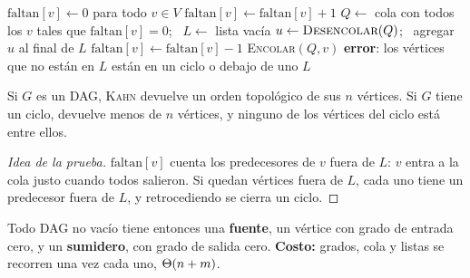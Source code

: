 \documentclass[11pt,letterpaper]{article}
\begin{document}
\begin{algorithm}[H]
\caption{\textsc{Kahn}$(G)$, orden topológico por grados de entrada}
\label{alg:kahn}
\begin{algorithmic}[1]
  \State $\text{faltan}[v] \gets 0$ para todo $v \in V$
      \State $\text{faltan}[v] \gets \text{faltan}[v] + 1$
    \EndFor
  \EndFor
  \State $Q \gets$ cola con todos los $v$ tales que
         $\text{faltan}[v] = 0$; \ $L \gets$ lista vacía
    \State $u \gets \textsc{Desencolar}(Q)$; \ agregar $u$ al final
           de $L$
      \State $\text{faltan}[v] \gets \text{faltan}[v] - 1$
        \State \textsc{Encolar}$(Q, v)$
      \EndIf
    \EndFor
  \EndWhile
    \State \textbf{error}: los vértices que no están en $L$ están en un
           ciclo o debajo de uno
  \EndIf
  \State \Return $L$
\EndProcedure
\end{algorithmic}
\end{algorithm}

\begin{proposicion}
  \label{prop:kahn-correcto}
  Si $G$ es un DAG, {\upshape\textsc{Kahn}} devuelve un orden
  topológico de sus $n$ vértices. Si $G$ tiene un ciclo, devuelve
  menos de $n$ vértices, y ninguno de los vértices del ciclo está entre
  ellos.
\end{proposicion}

\begin{proof}[Idea de la prueba]
  $\text{faltan}[v]$ cuenta los predecesores de $v$ fuera de $L$: $v$
  entra a la cola justo cuando todos salieron. Si quedan vértices fuera
  de $L$, cada uno tiene un predecesor fuera de $L$, y retrocediendo se
  cierra un ciclo.
\end{proof}

Todo DAG no vacío tiene entonces una \textbf{fuente}, un vértice con
grado de entrada cero, y un \textbf{sumidero}, con grado de salida
cero. \textbf{Costo:} grados, cola y listas se recorren una vez cada
uno, $\Theta\!\left(n + m\right)$.
\end{document}
